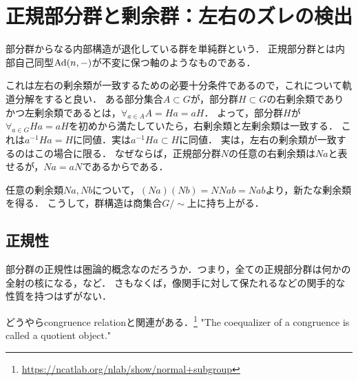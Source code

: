 \documentclass[uplatex,dvipdfmx]{jsreport}
\begin{document}
\section{正規部分群と剰余群：左右のズレの検出}

\begin{tcolorbox}[colframe=ForestGreen, colback=ForestGreen!10!white,breakable,colbacktitle=ForestGreen!40!white,coltitle=black,fonttitle=\bfseries\sffamily,
title=群構造が商集合上に持ち上がる時：共役類の概念と部分群の概念を合流させる]
    部分群からなる内部構造が退化している群を単純群という．
    正規部分群とは内部自己同型$\mathrm{Ad}(n,-)$が不変に保つ軸のようなものである．

    これは左右の剰余類が一致するための必要十分条件であるので，これについて軌道分解をすると良い．
    ある部分集合$A\subset G$が，部分群$H\subset G$の右剰余類でありかつ左剰余類であるとは，$\forall_{a\in A}A=Ha=aH$．
    よって，部分群$H$が$\forall_{a\in G}Ha=aH$を初めから満たしていたら，右剰余類と左剰余類は一致する．
    これは$a^{-1}Ha=H$に同値．実は$a^{-1}Ha\subset H$に同値．
    実は，左右の剰余類が一致するのはこの場合に限る．
    なぜならば，正規部分群$N$の任意の右剰余類は$Na$と表せるが，$Na=aN$であるからである．

    任意の剰余類$Na,Nb$について，$(Na)(Nb)=NNab=Nab$より，新たな剰余類を得る．
    こうして，群構造は商集合$G/\sim$上に持ち上がる．
\end{tcolorbox}

\subsection{正規性}

\begin{tcolorbox}[colframe=ForestGreen, colback=ForestGreen!10!white,breakable,colbacktitle=ForestGreen!40!white,coltitle=black,fonttitle=\bfseries\sffamily,
title=正規性とは何か]
    部分群の正規性は圏論的概念なのだろうか．つまり，全ての正規部分群は何かの全射の核になる，など．
    さもなくば，像関手に対して保たれるなどの関手的な性質を持つはずがない．
    
    どうやらcongruence relationと関連がある．\footnote{\url{https://ncatlab.org/nlab/show/normal+subgroup}}
    "The coequalizer of a congruence is called a quotient object."
\end{tcolorbox}
\end{document}

